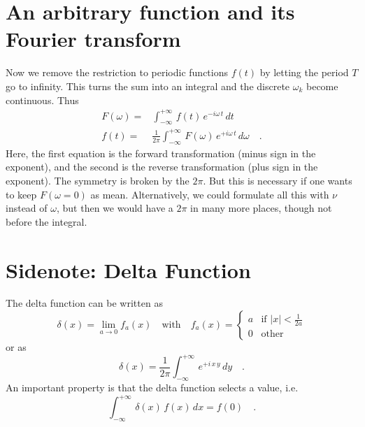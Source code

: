 \section{An arbitrary function and its Fourier transform}

Now we remove the restriction to periodic functions $f(t)$ by letting the period $T$ go to infinity. This turns the sum into an integral and the discrete $\omega_k$ become continuous. Thus
\begin{align}
 F(\omega) = & \int_{-\infty}^{+\infty} \, f(t) \, e^{- i \omega\, t} \, dt \\
 f(t) = & \frac{1}{2 \pi } \int_{-\infty}^{+\infty} \, F(\omega) \, e^{+ i \omega\, t} \, d\omega \quad .
\end{align}
Here, the first equation is the forward transformation (minus sign in the exponent), and the second is the reverse transformation (plus sign in the exponent). The symmetry is broken by the $2 \pi$. But this is necessary if one wants to keep $F(\omega = 0)$ as mean. Alternatively, we could formulate all this with $\nu$ instead of $\omega$, but then we would have a $2 \pi$ in many more places, though not before the integral.





\section{Sidenote: Delta Function}

The delta function can be written as
\begin{equation}
  \delta(x) = \lim_{a \rightarrow 0} f_a(x) \quad
   \text{with} \quad
    f_a(x) = \left\{ \begin{matrix}
    a & \text{if } |x| < \frac{1}{2a} \\
    0 & \text{other}
    \end{matrix}
    \right.
\end{equation}
or as
\begin{equation}
\delta(x) = \frac{1}{2 \pi}  \int_{-\infty}^{+\infty} \, e^{+ i\, x \, y} \, dy \quad .
\end{equation}
An important property is that the delta function selects a value, i.e. 
\begin{equation}
 \int_{-\infty}^{+\infty} \, \delta(x) \, f(x) \, dx = f(0) \quad .
\end{equation}


